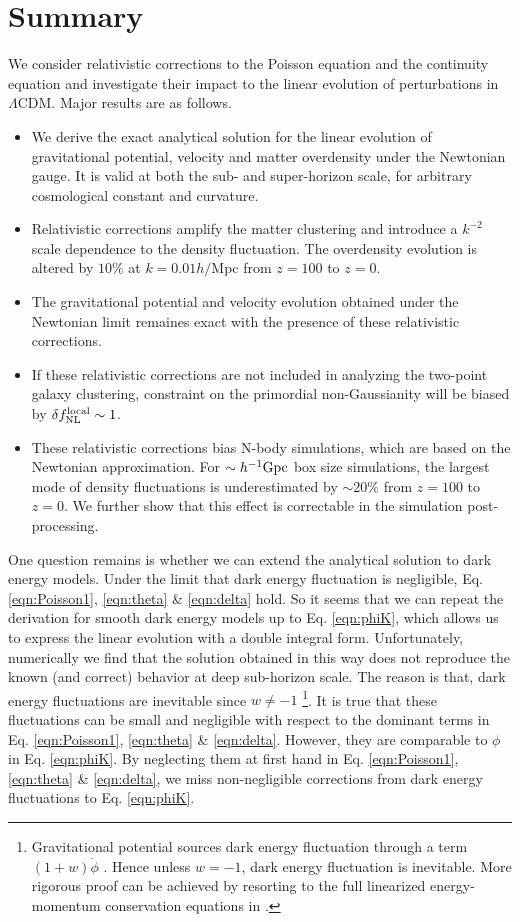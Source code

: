 \documentclass[aps,prl,showpacs,nobibnotes,twocolumn,
nobalancelastpage,superscriptaddress]{revtex4}
\newcommand{\bi}{\begin{itemize}}
\newcommand{\ei}{\end{itemize}}
\newcommand{\gpch}{h^{-1} {\rm Gpc}}
\begin{document}
\section{Summary}
We consider relativistic corrections to the Poisson equation
and the continuity equation and investigate their impact to the linear
evolution of perturbations in $\Lambda$CDM. Major results are as follows. 
\bi
\item We derive  the exact analytical solution for the
linear evolution of gravitational potential, velocity and matter overdensity under
the Newtonian gauge.  It is valid at both the sub- and super-horizon scale,
for arbitrary cosmological constant and curvature. 
\item Relativistic corrections amplify the matter clustering and  introduce a $k^{-2}$ scale dependence to the
  density fluctuation.  The overdensity evolution is altered by $10\%$ at
  $k=0.01h/$Mpc from $z=100$ to $z=0$. 
\item The gravitational potential and velocity evolution obtained under the
Newtonian limit remaines exact with the presence of these relativistic
corrections. 
\item  If these relativistic  corrections are not included in analyzing the
  two-point galaxy clustering,  constraint on the primordial non-Gaussianity
  will be biased by $\delta f^{\rm  local}_{\rm NL}\sim 1$. 
\item These relativistic corrections bias N-body simulations, which are based on the
  Newtonian approximation. For $\sim \gpch $ box size simulations, the largest
  mode of density fluctuations is underestimated by $\sim 20\%$ from $z=100$
  to $z=0$. We further show that this effect is correctable in the simulation
  post-processing. 

\ei

One question remains is whether we can extend the analytical solution to dark
energy models. Under the limit that dark energy fluctuation is negligible,
Eq. \ref{eqn:Poisson1}, \ref{eqn:theta} \& \ref{eqn:delta} hold. So it seems
that we can repeat the derivation for smooth dark energy models up to
Eq. \ref{eqn:phiK}, which allows us to express the linear evolution with a double
integral form.  Unfortunately, numerically we find that the solution obtained
in this way does not reproduce the known (and correct) behavior at deep
sub-horizon scale.  The reason is that, dark energy fluctuations are
inevitable since $w\neq -1$ \footnote{Gravitational potential sources dark
  energy fluctuation through a term $(1+w)\dot{\phi}$ \cite{Ma95}. Hence unless $w=-1$,
  dark energy fluctuation is inevitable. More rigorous proof can be achieved
  by resorting to the full linearized energy-momentum conservation equations in
  \cite{Ma95}. }.  It is true that these fluctuations can be small
and negligible  with respect to the dominant terms in Eq. \ref{eqn:Poisson1},
\ref{eqn:theta} \& \ref{eqn:delta}. However, they are comparable to $\phi$ in
Eq. \ref{eqn:phiK}.  By neglecting them at first hand in Eq. \ref{eqn:Poisson1},
\ref{eqn:theta} \& \ref{eqn:delta}, we miss non-negligible corrections
from dark energy fluctuations to Eq. \ref{eqn:phiK}.
\end{document}

